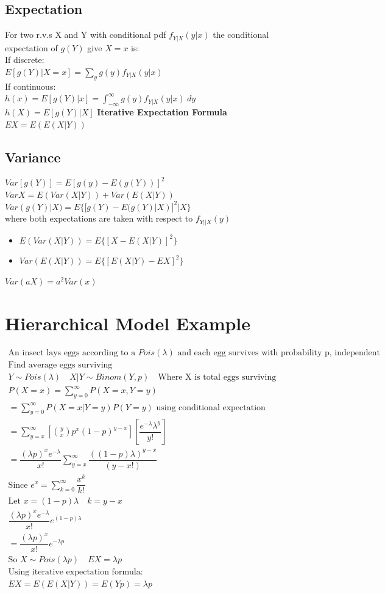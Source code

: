 \documentclass[openany]{book}
\begin{document}
\begin{flushleft}
\subsection{Expectation}
For two r.v.s X and Y with conditional pdf $f_{Y|X}(y|x)$ the conditional expectation of $g(Y)$ give $X=x$ is:\\
If discrete:\\
$E[g(Y)|X=x]=\sum_{y}g(y)f_{Y|X}(y|x)$\\
If continuous:\\
$h(x)=E[g(Y)|x]=\int_{-\infty}^{\infty}g(y)f_{Y|X}(y|x) \ dy$\\
$h(X)=E[g(Y)|X]$\medbreak
\textbf{Iterative Expectation Formula}\\
$EX=E(E(X|Y))$
\subsection{Variance}
$Var[g(Y)]=E[g(y)-E(g(Y))]^2$\medbreak
$VarX=E(Var(X|Y))+Var(E(X|Y))$\medbreak
$Var(g(Y)|X)=E\{[g(Y)-E(g(Y)|X)]^2|X\}$\\
where both expectations are taken with respect to $f_{Y||X}(y)$\\
\begin{itemize}
\item $E(Var(X|Y))=E\{[X-E(X|Y)]^2\}$\\
\item $Var(E(X|Y))=E\{[E(X|Y)-EX]^2\}$\\
\end{itemize}
$Var(aX)=a^2 Var(x)$
\section{Hierarchical Model Example}
\begin{multline*}
\text{An insect lays eggs according to a } Pois(\lambda) \text{ and each egg survives with probability p, independent}\\
\text{Find average eggs surviving}\\
Y\sim Pois(\lambda) \quad X|Y \sim Binom(Y,p) \quad \text{Where X is total eggs surviving}\\
P(X=x)=\sum_{y=0}^{\infty}P(X=x,Y=y)\\
=\sum_{y=0}^{\infty}P(X=x|Y=y)P(Y=y) \text{ using conditional expectation}\\
=\sum_{y=x}^{\infty}\left[{y \choose x} p^x(1-p)^{y-x} \right] \left[\dfrac{e^{-\lambda }\lambda^y}{y!} \right]\\
=\dfrac{(\lambda p)^x e^{-\lambda}}{x!}\sum_{y=x}^{\infty}\dfrac{((1-p)\lambda)^{y-x}}{(y-x!)}\\
\text{Since } e^x=\sum_{k=0}^{\infty}\dfrac{x^k}{k!}\\
\text{Let } x=(1-p)\lambda \quad k=y-x\\
\dfrac{(\lambda p)^x e^{-\lambda}}{x!}e^{(1-p)\lambda}\\
=\dfrac{(\lambda p)^x}{x!}e^{-\lambda p}\\
\text{So } X\sim Pois(\lambda p) \quad EX=\lambda p\\
\text{Using iterative expectation formula:}\\
EX=E(E(X|Y))=E(Yp)=\lambda p\\
\end{multline*}

\end{flushleft}
\end{document}
